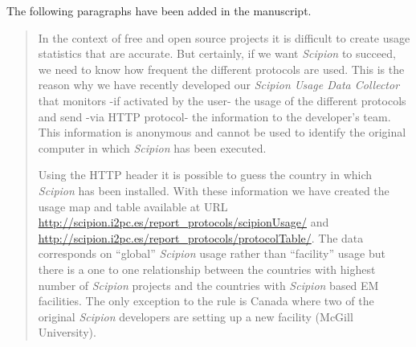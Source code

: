 \documentclass[a4paper,12pt]{article}
\def\scipion{\textit{Scipion}\xspace}
\begin{document}
\begin{reviewer}



\reply The following paragraphs have been added in the manuscript.

\begin{quote}

In the context of free and open source projects it is difficult to create usage statistics that are accurate. But certainly, if we want \scipion to succeed, we need to 
know how frequent the different protocols are used. This is the reason why we have recently developed our \textit{Scipion Usage Data Collector} that monitors -if activated by the user- the usage of the different protocols and send -via HTTP protocol- the information to the developer's team. This information is anonymous and cannot be used to identify the original computer in which \scipion has been executed. 

Using the HTTP header it is possible to guess the country in which \scipion has been installed. With these information we have created the usage map and table available at URL \url{http://scipion.i2pc.es/report_protocols/scipionUsage/} and  \url{http://scipion.i2pc.es/report_protocols/protocolTable/}. The data corresponds on ``global'' \scipion usage rather than ``facility'' usage but there 
is a one to one relationship between the  countries with highest number of \scipion projects and the countries with \scipion based EM facilities. The only exception to the rule is Canada where two of the original \scipion developers are setting up a new facility (McGill University).


\end{quote}
\end{reviewer}
\end{document}
